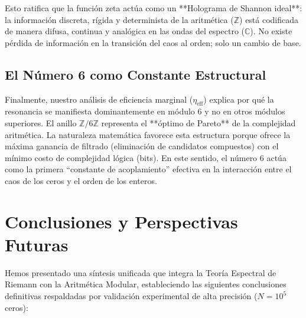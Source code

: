 \documentclass[12pt, a4paper]{article}
\theoremstyle{plain}
\theoremstyle{definition}
\newcommand{\Z}{\mathbb{Z}}
\newcommand{\C}{\mathbb{C}}
\begin{document}
Esto ratifica que la función zeta actúa como un **Holograma de Shannon ideal**: la información discreta, rígida y determinista de la aritmética ($\Z$) está codificada de manera difusa, continua y analógica en las ondas del espectro ($\C$). No existe pérdida de información en la transición del caos al orden; solo un cambio de base.

\subsection{El Número 6 como Constante Estructural}

Finalmente, nuestro análisis de eficiencia marginal ($\eta_{\text{eff}}$) explica por qué la resonancia se manifiesta dominantemente en módulo 6 y no en otros módulos superiores. El anillo $\Z/6\Z$ representa el **óptimo de Pareto** de la complejidad aritmética. La naturaleza matemática favorece esta estructura porque ofrece la máxima ganancia de filtrado (eliminación de candidatos compuestos) con el mínimo costo de complejidad lógica (bits). En este sentido, el número 6 actúa como la primera ``constante de acoplamiento'' efectiva en la interacción entre el caos de los ceros y el orden de los enteros.

\section{Conclusiones y Perspectivas Futuras}

Hemos presentado una síntesis unificada que integra la Teoría Espectral de Riemann con la Aritmética Modular, estableciendo las siguientes conclusiones definitivas respaldadas por validación experimental de alta precisión ($N=10^5$ ceros):
\end{document}
